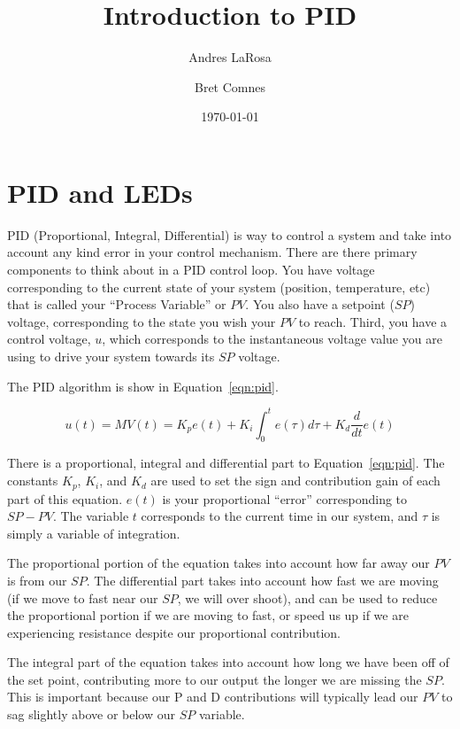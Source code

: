 \documentclass[11pt,a4paper]{article}
\begin{document}
\title{Introduction to PID}
\date{\today} 
\author{Andres LaRosa}
\author{Bret Comnes}
\maketitle

\section{PID and LEDs} %
\label{sec:pid_and_leds}

PID (Proportional, Integral, Differential) is way to control a system and take into account any kind error in your control mechanism.   There are there primary components to think about in a PID control loop. You have voltage corresponding to the current state of your system (position, temperature, etc) that is called your ``Process Variable'' or $PV$.  You also have a setpoint ($SP$) voltage, corresponding to the state you wish your $PV$ to reach.  Third, you have a control voltage, $u$, which corresponds to the instantaneous voltage value you are using to drive your system towards its $SP$ voltage.

The PID algorithm is show in Equation~\ref{eqn:pid}.


\begin{equation}
    \label{eqn:pid}
    u(t) = MV(t) = K_{p} e(t) + K_{i} \int _{0}^t e(\tau)d\tau + K_{d} \frac{d}{dt}e(t)
\end{equation}

There is a proportional, integral and differential part to Equation~\ref{eqn:pid}.  The constants $K_{p}$, $K_{i}$, and $K_{d}$ are used to set the sign and contribution gain of each part of this equation.  $e(t)$ is your proportional ``error'' corresponding to $SP - PV$.  The variable $t$ corresponds to the current time in our system, and $\tau$ is simply a variable of integration.  

The proportional portion of the equation takes into account how far away our $PV$ is from our $SP$.  The differential part takes into account how fast we are moving (if we move to fast near our $SP$, we will over shoot), and can be used to reduce the proportional portion if we are moving to fast, or speed us up if we are experiencing resistance despite our proportional contribution.  

The integral part of the equation takes into account how long we have been off of the set point, contributing more to our output the longer we are missing the $SP$.  This is important because our P and D contributions will typically lead our $PV$ to sag slightly above or below our $SP$ variable.\cite{pid}
\end{document}
